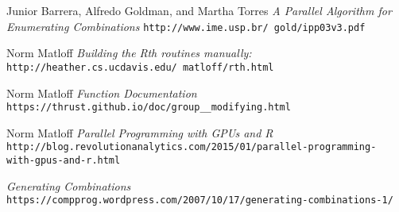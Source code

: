 \documentclass[12pt]{article}
\begin{document}
{\begin{thebibliography}{9}
Junior Barrera, Alfredo Goldman, and Martha Torres
\textit{A Parallel Algorithm for Enumerating Combinations}
\texttt{http://www.ime.usp.br/~gold/ipp03v3.pdf}
 
Norm Matloff
\textit{Building the Rth routines manually:}
\texttt{http://heather.cs.ucdavis.edu/~matloff/rth.html}

Norm Matloff
\textit{Function Documentation}
\texttt{https://thrust.github.io/doc/group\_\_modifying.html}

Norm Matloff
\textit{Parallel Programming with GPUs and R}
\texttt{http://blog.revolutionanalytics.com/2015/01/parallel-programming-
with-gpus-and-r.html}

\textit{Generating Combinations}
\texttt{https://compprog.wordpress.com/2007/10/17/generating-combinations-1/}


\end{thebibliography}


}
\end{document}
